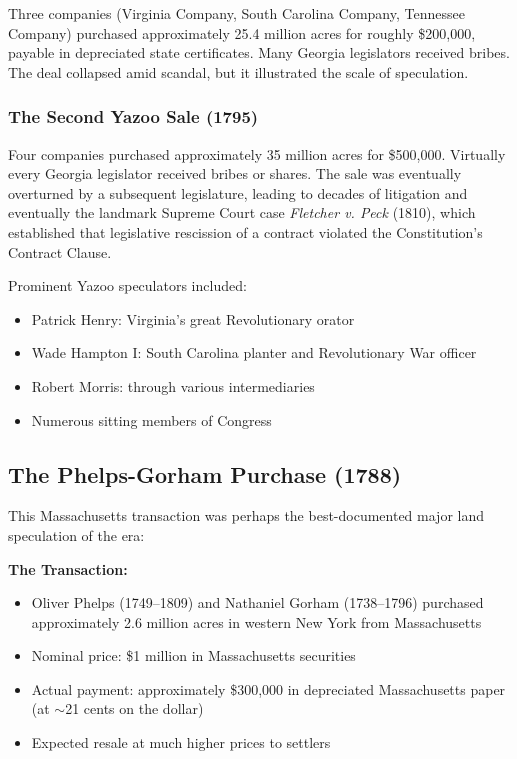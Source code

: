 \documentclass[12pt]{article}
\begin{document}
Three companies (Virginia Company, South Carolina Company, Tennessee Company) purchased approximately 25.4 million acres for roughly \$200,000, payable in depreciated state certificates. Many Georgia legislators received bribes. The deal collapsed amid scandal, but it illustrated the scale of speculation.

\subsubsection{The Second Yazoo Sale (1795)}

Four companies purchased approximately 35 million acres for \$500,000. Virtually every Georgia legislator received bribes or shares. The sale was eventually overturned by a subsequent legislature, leading to decades of litigation and eventually the landmark Supreme Court case \textit{Fletcher v. Peck} (1810), which established that legislative rescission of a contract violated the Constitution's Contract Clause.

Prominent Yazoo speculators included:
\begin{itemize}
\item Patrick Henry: Virginia's great Revolutionary orator
\item Wade Hampton I: South Carolina planter and Revolutionary War officer
\item Robert Morris: through various intermediaries
\item Numerous sitting members of Congress
\end{itemize}

\subsection{The Phelps-Gorham Purchase (1788)}

This Massachusetts transaction was perhaps the best-documented major land speculation of the era:

\textbf{The Transaction:}
\begin{itemize}
\item Oliver Phelps (1749--1809) and Nathaniel Gorham (1738--1796) purchased approximately 2.6 million acres in western New York from Massachusetts
\item Nominal price: \$1 million in Massachusetts securities
\item Actual payment: approximately \$300,000 in depreciated Massachusetts paper (at $\sim$21 cents on the dollar)
\item Expected resale at much higher prices to settlers
\end{itemize}
\end{document}
